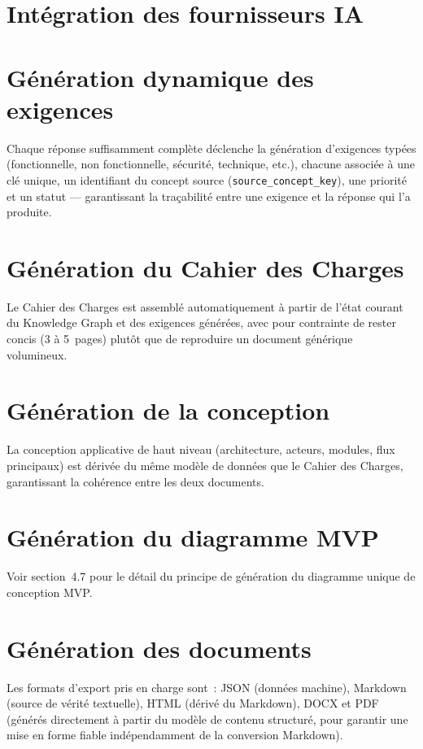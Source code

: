 \section{Intégration des fournisseurs IA}

\section{Génération dynamique des exigences}
Chaque réponse suffisamment complète déclenche la génération d'exigences typées
(fonctionnelle, non fonctionnelle, sécurité, technique, etc.), chacune associée à une
clé unique, un identifiant du concept source (\texttt{source\_concept\_key}), une
priorité et un statut — garantissant la traçabilité entre une exigence et la réponse
qui l'a produite.

\section{Génération du Cahier des Charges}
Le Cahier des Charges est assemblé automatiquement à partir de l'état courant du
Knowledge Graph et des exigences générées, avec pour contrainte de rester concis
(3 à 5~pages) plutôt que de reproduire un document générique volumineux.

\section{Génération de la conception}
La conception applicative de haut niveau (architecture, acteurs, modules,
flux principaux) est dérivée du même modèle de données que le Cahier des Charges,
garantissant la cohérence entre les deux documents.

\section{Génération du diagramme MVP}
Voir section~4.7 pour le détail du principe de génération du diagramme unique de
conception MVP.

\section{Génération des documents}
Les formats d'export pris en charge sont~: JSON (données machine), Markdown (source de
vérité textuelle), HTML (dérivé du Markdown), DOCX et PDF (générés directement à partir
du modèle de contenu structuré, pour garantir une mise en forme fiable indépendamment de
la conversion Markdown).
